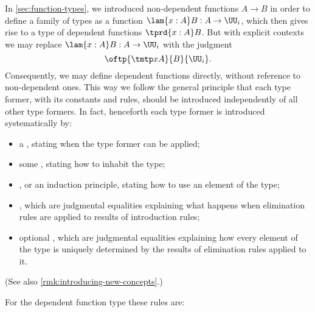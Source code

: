 In \autoref{sec:function-types}, we introduced non-dependent functions $A\to B$ in
order to define a family of types as a function $\lam{x:A} B:A\to\UU_i$, which
then gives rise to a type of dependent functions $\tprd{x:A} B$. But with explicit contexts
we may replace $\lam{x:A} B:A\to\UU_i$ with the judgment
%
\begin{equation*}
  \oftp{\tmtp xA}{B}{\UU_i}.
\end{equation*}
%
Consequently, we may define dependent functions directly, without reference to non-dependent ones. This way we follow the general principle that each type former, with its constants and rules, should be introduced independently of all other type formers.
%
In fact, henceforth each type former is introduced systematically by:
\begin{itemize}
\item a , stating when the type former can be applied;
\item some , stating how to inhabit the type;
\item {}, or an induction principle, stating how to use an
  element of the type;
\item {}, which are judgmental equalities explaining what happens when elimination rules are applied to results of introduction rules;
\item optional , which are judgmental equalities explaining how every element of the type is uniquely determined by the results of elimination rules applied to it.
\end{itemize}
(See also \autoref{rmk:introducing-new-concepts}.)

For the dependent function type these rules are:
%

